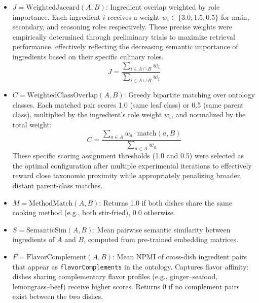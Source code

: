 \begin{itemize}
  \item $J = \text{WeightedJaccard}(A, B)$: Ingredient overlap weighted by role importance. Each ingredient $i$ receives a weight $w_i \in \{3.0, 1.5, 0.5\}$ for main, secondary, and seasoning roles respectively. These precise weights were empirically determined through preliminary trials to maximize retrieval performance, effectively reflecting the decreasing semantic importance of ingredients based on their specific culinary roles.
  \[
    J = \frac{\sum_{i \in A \cap B} w_i}{\sum_{i \in A \cup B} w_i}
  \]

  \item $C = \text{WeightedClassOverlap}(A, B)$: Greedy bipartite matching over ontology classes. Each matched pair scores 1.0 (same leaf class) or 0.5 (same parent class), multiplied by the ingredient's role weight $w_i$, and normalized by the total weight:
  \[
    C = \frac{\sum_{a \in A} w_a \cdot \text{match}(a, B)}{\sum_{a \in A} w_a}
  \]
  These specific scoring assignment thresholds (1.0 and 0.5) were selected as the optimal configuration after multiple experimental iterations to effectively reward close taxonomic proximity while appropriately penalizing broader, distant parent-class matches.

  \item $M = \text{MethodMatch}(A, B)$: Returns 1.0 if both dishes share the same cooking method (e.g., both stir-fried), 0.0 otherwise.

  \item $S = \text{SemanticSim}(A, B)$: Mean pairwise semantic similarity between ingredients of $A$ and $B$, computed from pre-trained embedding matrices.

  \item $F = \text{FlavorComplement}(A, B)$: Mean NPMI of cross-dish ingredient pairs that appear as \texttt{flavorComplements} in the ontology. Captures flavor affinity: dishes sharing complementary flavor profiles (e.g., ginger--seafood, lemongrass--beef) receive higher scores. Returns 0 if no complement pairs exist between the two dishes.
\end{itemize}